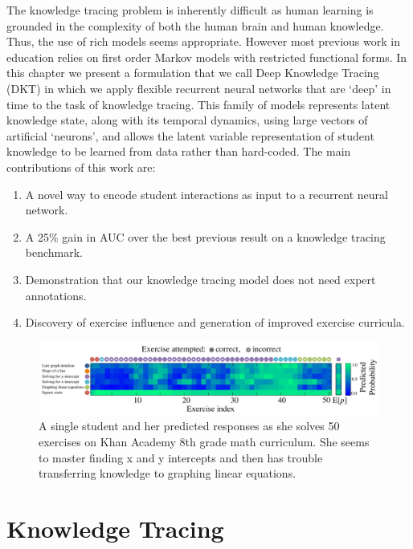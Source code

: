 The knowledge tracing problem is inherently difficult as human learning is grounded in the complexity of both the human brain and human knowledge.
Thus, the use of rich models seems appropriate.
However most previous work in education relies on first order Markov models with restricted functional forms. In this chapter we present a formulation that we call Deep Knowledge Tracing (DKT) in which we apply flexible recurrent neural networks that are `deep' in time to the task of knowledge tracing. 
This family of models represents latent knowledge state, along with its temporal dynamics, using large vectors of artificial `neurons', and allows the latent variable representation of student knowledge to be learned from data rather than hard-coded.
The main contributions of this work are:
\begin{enumerate}
\item A novel way to encode student interactions as input to a recurrent neural network.
\item A 25\% gain in AUC over the best previous result on a knowledge tracing benchmark. 
\item Demonstration that our knowledge tracing model does not need expert annotations.
\item Discovery of exercise influence and generation of improved exercise curricula.
\end{enumerate}

\begin{figure}[t]
\centering
\includegraphics[width=1.0\textwidth]{img/singleStudent}

\caption[Single Khan student trace]{A single student and her predicted responses as she solves 50 exercises on Khan Academy 8th grade math curriculum. She seems to master finding x and y intercepts and then has trouble transferring knowledge to graphing linear equations.
\label{fig:singleStudent}
}

\end{figure}

\section{Knowledge Tracing}


